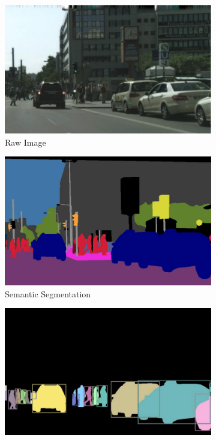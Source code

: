 \begin{figure}[htb]
    \centering
    \begin{subfigure}[t]{.45\linewidth}
        \centering
        \includegraphics[width=1\textwidth]{figures/RawImage.png}
        \caption{Raw Image}\label{Raw Image}
    \end{subfigure}
    \begin{subfigure}[t]{.45\linewidth}
        \centering
        \includegraphics[width=1\textwidth]{figures/Semantic Segmentation2.png}
        \caption{Semantic Segmentation}\label{Semantic Segmentation}
    \end{subfigure}
    \begin{subfigure}[t]{.45\linewidth}
        \centering
        \includegraphics[width=1\textwidth]{figures/Instance Segmentation2.png}

\end{subfigure}
\end{figure}
